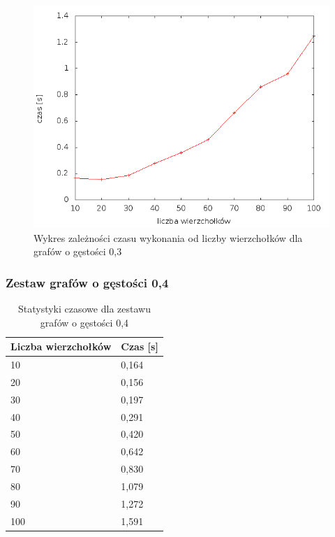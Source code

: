\documentclass[12pt, a4paper]{article}
\begin{document}
\begin{figure}[h]
    \begin{center}
	\includegraphics[scale=0.5]{results/img/den/den_03.png}
	\caption{Wykres zależności czasu wykonania od liczby wierzchołków dla grafów o gęstości 0,3}
    \end{center}
\end{figure}

\subsubsection*{Zestaw grafów o gęstości 0,4}
\begin{table}[H]
\caption{Statystyki czasowe dla zestawu grafów o gęstości 0,4}
\begin{center}
    \begin{tabular}{|l|l|}
    \hline
    Liczba wierzchołków & Czas [s] \\ \hline
    10 & 0,164 \\ \hline
    20 & 0,156 \\ \hline
    30 & 0,197 \\ \hline
    40 & 0,291 \\ \hline
    50 & 0,420 \\ \hline
    60 & 0,642 \\ \hline
    70 & 0,830 \\ \hline
    80 & 1,079 \\ \hline
    90 & 1,272 \\ \hline
    100 & 1,591 \\ \hline
    \end{tabular}
\end{center}
\end{table}
\end{document}

